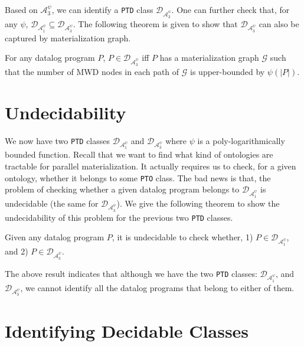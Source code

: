 \documentclass{article}
\begin{document}
Based on $\mathcal{A}_3^{\psi}$, we can identify a \texttt{PTD} class $\mathcal{D}_{\mathcal{A}_3^{\psi}}$. One can further check that, for any $\psi$, $\mathcal{D}_{\mathcal{A}_1^{\psi}}\subseteq\mathcal{D}_{\mathcal{A}_3^{\psi}}$.
The following theorem is given to show that $\mathcal{D}_{\mathcal{A}_3^{\psi}}$ can also be captured by materialization graph.

\begin{theorem}
For any datalog program $P$, $P\in\mathcal{D}_{\mathcal{A}_3^{\psi}}$ iff $P$ has a materialization graph $\mathcal{G}$ such that the number of MWD nodes in each path of $\mathcal{G}$ is upper-bounded by $\psi(|P|)$.
\end{theorem}

\section{Undecidability}

We now have two \texttt{PTD} classes $\mathcal{D}_{\mathcal{A}_1^{\psi}}$ and $\mathcal{D}_{\mathcal{A}_3^{\psi}}$
where $\psi$ is a poly-logarithmically bounded function. Recall that we want to find what kind of ontologies are tractable for parallel materialization. It actually requires us to check, for a given ontology, whether it belongs to some \texttt{PTO} class. The bad news is that, the problem of checking whether a given datalog program belongs to $\mathcal{D}_{\mathcal{A}_1^{\psi}}$ is undecidable (the same for $\mathcal{D}_{\mathcal{A}_3^{\psi}}$). We give the following theorem to show the undecidability of this problem for the previous two \texttt{PTD} classes.

\begin{theorem} Given any datalog program $P$, it is undecidable to check whether, 1) $P\in\mathcal{D}_{\mathcal{A}_1^{\psi}}$, and 2) $P\in\mathcal{D}_{\mathcal{A}_3^{\psi}}$.
\end{theorem}

The above result indicates that although we have the two \texttt{PTD} classes: $\mathcal{D}_{\mathcal{A}_1^{\psi}}$, and $\mathcal{D}_{\mathcal{A}_3^{\psi}}$, we cannot identify all the datalog
programs that belong to either of them.


\section{Identifying Decidable Classes}
\end{document}
